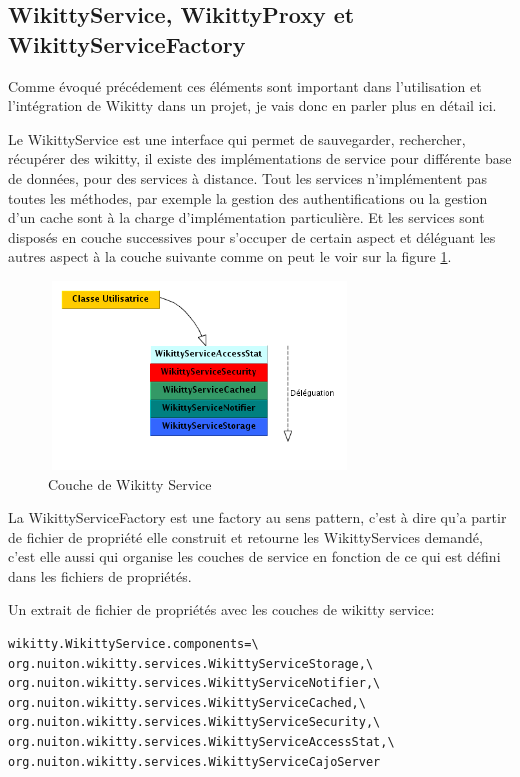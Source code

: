 \subsection{WikittyService, WikittyProxy et WikittyServiceFactory}

Comme évoqué précédement ces éléments sont important dans l'utilisation et 
l'intégration de Wikitty dans un projet, je vais donc en parler plus en détail
ici.

Le WikittyService est une interface qui permet de sauvegarder, rechercher,
récupérer des wikitty, il existe des implémentations de service pour différente
base de données, pour des services à distance. Tout les services n'implémentent 
pas toutes les méthodes, par exemple la gestion des authentifications ou la 
gestion d'un cache sont à la charge d'implémentation particulière. Et les
services sont disposés en couche successives pour s'occuper de certain aspect
et déléguant les autres aspect à la couche suivante comme on peut le voir sur 
la figure \ref{pileService}.

\begin{figure}[!ht]
\centering
\includegraphics[height=5cm,width=8cm]{image/pileService.png}
  		\caption{Couche de Wikitty Service}
  		\label{pileService}
\end{figure}

La WikittyServiceFactory est une factory au sens pattern, c'est à dire qu'a 
partir de fichier de propriété elle construit et retourne les WikittyServices 
demandé, c'est elle aussi qui organise les couches de service en fonction de ce 
qui est défini dans les fichiers de propriétés.


Un extrait de fichier de propriétés avec les couches de wikitty service:
\begin{verbatim}
wikitty.WikittyService.components=\
org.nuiton.wikitty.services.WikittyServiceStorage,\
org.nuiton.wikitty.services.WikittyServiceNotifier,\
org.nuiton.wikitty.services.WikittyServiceCached,\
org.nuiton.wikitty.services.WikittyServiceSecurity,\
org.nuiton.wikitty.services.WikittyServiceAccessStat,\
org.nuiton.wikitty.services.WikittyServiceCajoServer
\end{verbatim}

